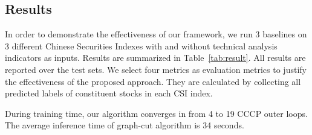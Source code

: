 \documentclass[sigconf]{acmart}
\begin{document}
\subsection{Results}
\label{sec:res}

In order to demonstrate the effectiveness of our framework, we
run 3 baselines on 3 different Chinese Securities Indexes with
and without technical analysis indicators as inputs. Results are
summarized in Table~\ref{tab:result}. All results are reported
over the test sets. We select four metrics as evaluation metrics
to justify the effectiveness of the proposed approach. They are
calculated by collecting all predicted labels of constituent
stocks in each CSI index.

During training time, our algorithm converges in from 4 to 19
CCCP outer loops. The average inference time of graph-cut
algorithm is 34 seconds.
\end{document}
